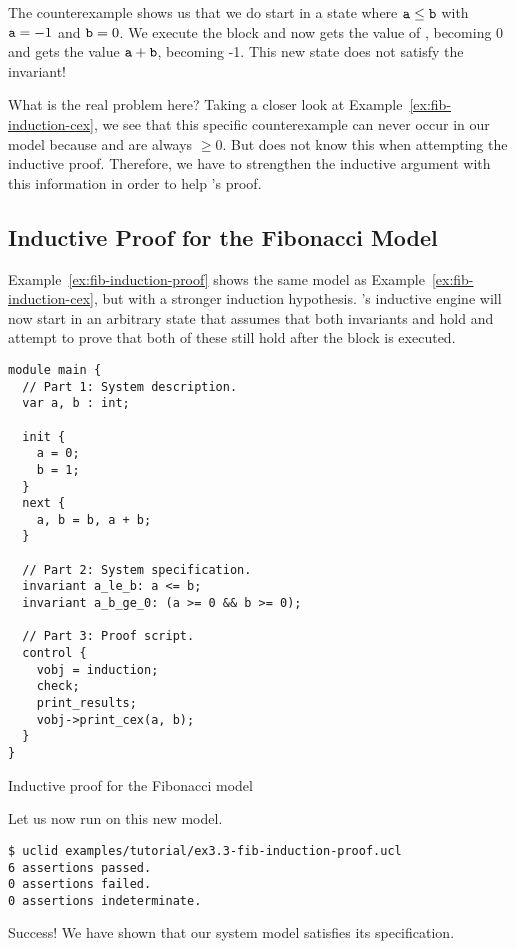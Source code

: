 The counterexample shows us that we do start in a state where $\texttt{a} \le \texttt{b}$ with $\texttt{a}=-1$ and $\texttt{b}=0$. We execute the  block and now  gets the value of , becoming 0 and  gets the value $\texttt{a} + \texttt{b}$, becoming -1. This new state does not satisfy the invariant!

What is the real problem here? Taking a closer look at Example~\ref{ex:fib-induction-cex}, we see that this specific counterexample can never occur in our model because  and  are always $\ge 0$. But \uclid{} does not know this when attempting the inductive proof. Therefore, we have to strengthen the inductive argument with this information in order to help \uclid{}'s proof.

\subsection{Inductive Proof for the Fibonacci Model}

Example~\ref{ex:fib-induction-proof} shows the same model as Example~\ref{ex:fib-induction-cex}, but with a stronger induction hypothesis. \uclid{}'s inductive engine will now start in an arbitrary state that assumes that both invariants  and  hold and attempt to prove that both of these still hold after the  block is executed.

\begin{uclidlisting}[htbp]
\begin{lstlisting}[language=uclid,style=uclidstyle]
module main {
  // Part 1: System description.
  var a, b : int;

  init {
    a = 0;
    b = 1;
  }
  next {
    a, b = b, a + b;
  }

  // Part 2: System specification.
  invariant a_le_b: a <= b;
  invariant a_b_ge_0: (a >= 0 && b >= 0);

  // Part 3: Proof script.
  control {
    vobj = induction;
    check;
    print_results;
    vobj->print_cex(a, b);
  }
}
\end{lstlisting}
\caption{Inductive proof for the Fibonacci model}
\label{ex:fib-induction-proof}
\end{uclidlisting}

Let us now run \uclid{} on this new model.

\begin{Verbatim}[frame=single, samepage=true]
$ uclid examples/tutorial/ex3.3-fib-induction-proof.ucl 
6 assertions passed.
0 assertions failed.
0 assertions indeterminate.
\end{Verbatim}

Success! We have shown that our system model satisfies its specification.

